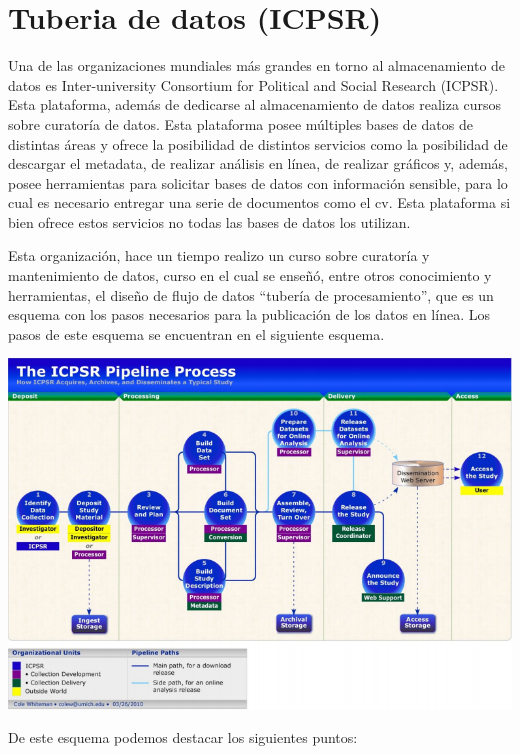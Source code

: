 \documentclass[
  14pt,
]{book}
\let\origfigure\figure
\let\endorigfigure\endfigure
\renewenvironment{figure}[1][2] {
  \expandafter\origfigure\expandafter[H]
} {
  \endorigfigure
}
\begin{document}
\hypertarget{tuberia-de-datos-icpsr}{%
\section{Tuberia de datos (ICPSR)}\label{tuberia-de-datos-icpsr}}

Una de las organizaciones mundiales más grandes en torno al almacenamiento de datos es Inter-university Consortium for Political and Social Research (ICPSR). Esta plataforma, además de dedicarse al almacenamiento de datos realiza cursos sobre curatoría de datos. Esta plataforma posee múltiples bases de datos de distintas áreas y ofrece la posibilidad de distintos servicios como la posibilidad de descargar el metadata, de realizar análisis en línea, de realizar gráficos y, además, posee herramientas para solicitar bases de datos con información sensible, para lo cual es necesario entregar una serie de documentos como el cv. Esta plataforma si bien ofrece estos servicios no todas las bases de datos los utilizan.

Esta organización, hace un tiempo realizo un curso sobre curatoría y mantenimiento de datos, curso en el cual se enseñó, entre otros conocimiento y herramientas, el diseño de flujo de datos ``tubería de procesamiento'', que es un esquema con los pasos necesarios para la publicación de los datos en línea. Los pasos de este esquema se encuentran en el siguiente esquema.

\begin{figure}[!ht]

{\centering \includegraphics[width=0.8\linewidth,]{pipeline-ICPSR} 

}

\caption{Propuesta ICPSR}\label{fig:unnamed-chunk-23}
\end{figure}

De este esquema podemos destacar los siguientes puntos:
\end{document}
